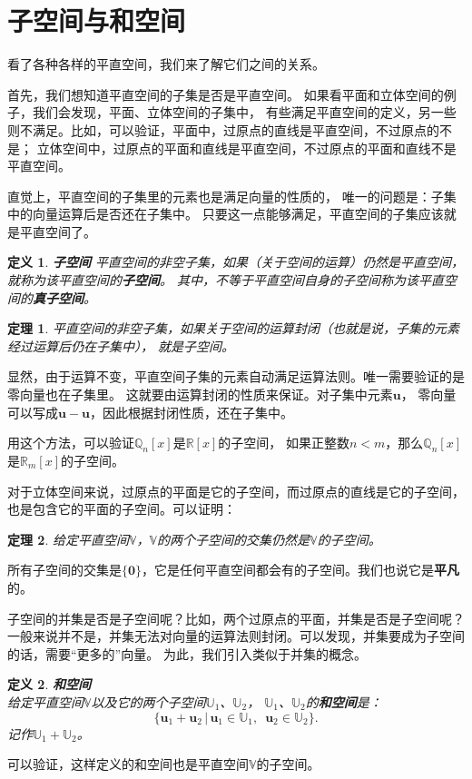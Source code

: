 \documentclass[12pt,UTF8]{ctexbook}
\newtheorem{df}{定义}[section]
\newtheorem{tm}{定理}[section]
\begin{document}
\section{子空间与和空间}
看了各种各样的平直空间，我们来了解它们之间的关系。

首先，我们想知道平直空间的子集是否是平直空间。
如果看平面和立体空间的例子，我们会发现，平面、立体空间的子集中，
有些满足平直空间的定义，另一些则不满足。比如，可以验证，平面中，过原点的直线是平直空间，不过原点的不是；
立体空间中，过原点的平面和直线是平直空间，不过原点的平面和直线不是平直空间。

直觉上，平直空间的子集里的元素也是满足向量的性质的，
唯一的问题是：子集中的向量运算后是否还在子集中。
只要这一点能够满足，平直空间的子集应该就是平直空间了。

\begin{df}{\textbf{子空间}}
    平直空间的非空子集，如果（关于空间的运算）仍然是平直空间，就称为该平直空间的\textbf{子空间}。
    其中，不等于平直空间自身的子空间称为该平直空间的\textbf{真子空间}。
\end{df}

\begin{tm}
    平直空间的非空子集，如果关于空间的运算封闭（也就是说，子集的元素经过运算后仍在子集中），
    就是子空间。
\end{tm}

显然，由于运算不变，平直空间子集的元素自动满足运算法则。唯一需要验证的是零向量也在子集里。
这就要由运算封闭的性质来保证。对子集中元素$\mathbf{u}$，
零向量可以写成$\mathbf{u} - \mathbf{u}$，因此根据封闭性质，还在子集中。

用这个方法，可以验证$\mathbb{Q}_n[x]$是$\mathbb{R}[x]$的子空间，
如果正整数$n<m$，那么$\mathbb{Q}_n[x]$是$\mathbb{R}_m[x]$的子空间。

对于立体空间来说，过原点的平面是它的子空间，而过原点的直线是它的子空间，
也是包含它的平面的子空间。可以证明：

\begin{tm}
    给定平直空间$\mathbb{V}$，$\mathbb{V}$的两个子空间的交集仍然是$\mathbb{V}$的子空间。
\end{tm}

所有子空间的交集是$\{\mathbf{0}\}$，它是任何平直空间都会有的子空间。我们也说它是\textbf{平凡}的。

子空间的并集是否是子空间呢？比如，两个过原点的平面，并集是否是子空间呢？
一般来说并不是，并集无法对向量的运算法则封闭。可以发现，并集要成为子空间的话，需要“更多的”向量。
为此，我们引入类似于并集的概念。

\begin{df}{\textbf{和空间}}
    \mbox{} \\
    给定平直空间$\mathbb{V}$以及它的两个子空间$\mathbb{U}_1$、$\mathbb{U}_2$，
    $\mathbb{U}_1$、$\mathbb{U}_2$的\textbf{和空间}是：
    $$ \{ \mathbf{u}_1 + \mathbf{u}_2\,|\, \mathbf{u}_1 \in \mathbb{U}_1,\,\,\, \mathbf{u}_2 \in \mathbb{U}_2\}.$$
    记作$\mathbb{U}_1 + \mathbb{U}_2$。
\end{df}
可以验证，这样定义的和空间也是平直空间$\mathbb{V}$的子空间。
\end{document}
